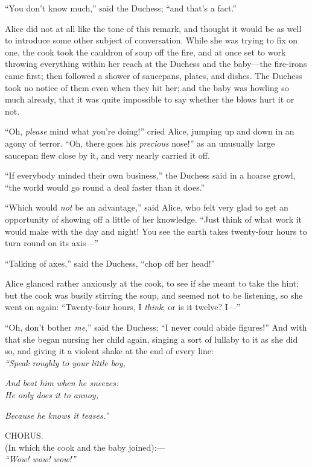 \documentclass[book, 20pt]{extbook}
\begin{document}
``You don't know much,'' said the Duchess; ``and that's a fact.''

Alice did not at all like the tone of this remark, and thought it would
be as well to introduce some other subject of conversation. While she
was trying to fix on one, the cook took the cauldron of soup off the
fire, and at once set to work throwing everything within her reach at
the Duchess and the baby---the fire-irons came first; then followed a
shower of saucepans, plates, and dishes. The Duchess took no notice of
them even when they hit her; and the baby was howling so much already,
that it was quite impossible to say whether the blows hurt it or not.

``Oh, \emph{please} mind what you're doing!'' cried Alice, jumping up
and down in an agony of terror. ``Oh, there goes his \emph{precious}
nose!'' as an unusually large saucepan flew close by it, and very nearly
carried it off.

``If everybody minded their own business,'' the Duchess said in a hoarse
growl, ``the world would go round a deal faster than it does.''

``Which would \emph{not} be an advantage,'' said Alice, who felt very
glad to get an opportunity of showing off a little of her knowledge.
``Just think of what work it would make with the day and night! You see
the earth takes twenty-four hours to turn round on its axis---''

``Talking of axes,'' said the Duchess, ``chop off her head!''

Alice glanced rather anxiously at the cook, to see if she meant to take
the hint; but the cook was busily stirring the soup, and seemed not to
be listening, so she went on again: ``Twenty-four hours, I \emph{think};
or is it twelve? I---''

``Oh, don't bother \emph{me},'' said the Duchess; ``I never could abide
figures!'' And with that she began nursing her child again, singing a
sort of lullaby to it as she did so, and giving it a violent shake at
the end of every line:\\
\bigskip
\noindent\emph{``Speak roughly to your little boy,}

\emph{And beat him when he sneezes:\\}
\noindent\emph{He only does it to annoy,}

\emph{Because he knows it teases.''}

\begin{center}
CHORUS.\\
(In which the cook and the baby joined):---\\

\center\emph{``Wow! wow! wow!''}
\end{center}
\end{document}
